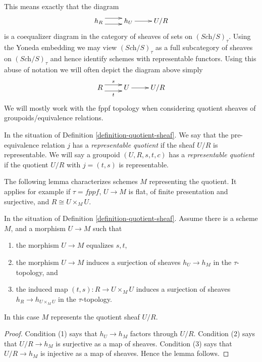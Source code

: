 \noindent
This means exactly that the diagram
$$
\xymatrix{
h_R \ar@<1ex>[r] \ar@<-1ex>[r] &
h_U \ar[r] &
U/R
}
$$
is a coequalizer diagram in the category of sheaves of sets
on $(\textit{Sch}/S)_\tau$. Using the Yoneda embedding we
may view $(\textit{Sch}/S)_\tau$ as a full subcategory of
sheaves on $(\textit{Sch}/S)_\tau$ and hence identify schemes
with representable functors. Using this abuse of notation
we will often depict the diagram above simply
$$
\xymatrix{
R \ar@<1ex>[r]^s \ar@<-1ex>[r]_t &
U \ar[r] &
U/R
}
$$
We will mostly work with the fppf topology when considering
quotient sheaves of groupoids/equivalence relations.

\begin{definition}
\label{definition-representable-quotient}
In the situation of Definition \ref{definition-quotient-sheaf}.
We say that the pre-equivalence relation $j$ has a
{\it representable quotient} if the sheaf $U/R$ is representable.
We will say a groupoid $(U, R, s, t, c)$ has a
{\it representable quotient}
if the quotient $U/R$ with $j = (t, s)$ is representable.
\end{definition}

\noindent
The following lemma characterizes schemes $M$ representing the quotient.
It applies for example if $\tau = fppf$, $U \to M$ is flat,
of finite presentation and surjective, and $R \cong U \times_M U$.

\begin{lemma}
\label{lemma-criterion-quotient-representable}
In the situation of Definition \ref{definition-quotient-sheaf}.
Assume there is a scheme $M$, and a morphism $U \to M$ such that
\begin{enumerate}
\item the morphism $U \to M$ equalizes $s, t$,
\item the morphism $U \to M$ induces a surjection of sheaves
$h_U \to h_M$ in the $\tau$-topology, and
\item the induced map $(t, s) : R \to U \times_M U$ induces a
surjection of sheaves $h_R \to h_{U \times_M U}$ in the $\tau$-topology.
\end{enumerate}
In this case $M$ represents the quotient sheaf $U/R$.
\end{lemma}

\begin{proof}
Condition (1) says that $h_U \to h_M$ factors through $U/R$.
Condition (2) says that $U/R \to h_M$ is surjective as a map of sheaves.
Condition (3) says that $U/R \to h_M$ is injective as a map of sheaves.
Hence the lemma follows.
\end{proof}

